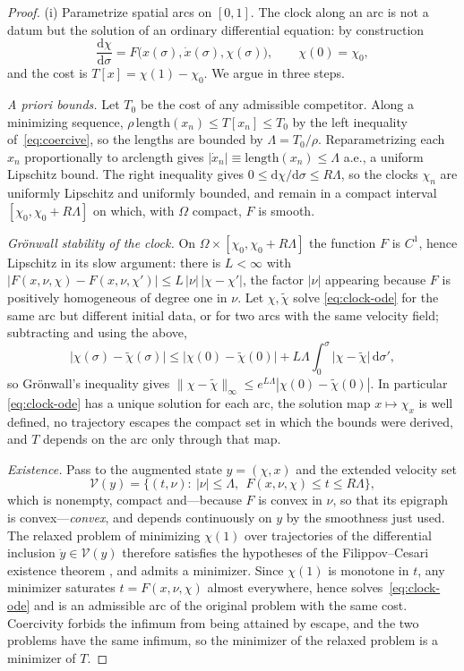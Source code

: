 \documentclass[12pt]{iopart}
\newcommand{\dd}{\mathrm{d}}
\theoremstyle{plain}
\theoremstyle{definition}
\theoremstyle{plain}
\theoremstyle{remark}
\begin{document}
\begin{proof}
(i) Parametrize spatial arcs on $[0,1]$. The clock along an arc is not a datum but the
solution of an ordinary differential equation: by construction
\begin{equation}
   \frac{\dd\chi}{\dd\sigma}=F\big(x(\sigma),\dot x(\sigma),\chi(\sigma)\big),
   \qquad \chi(0)=\chi_0 ,
   \label{eq:clock-ode}
\end{equation}
and the cost is $T[x]=\chi(1)-\chi_0$. We argue in three steps.

\emph{A priori bounds.} Let $T_0$ be the cost of any admissible competitor. Along a
minimizing sequence, $\rho\,\mathrm{length}(x_n)\le T[x_n]\le T_0$ by the left inequality
of~\eqref{eq:coercive}, so the lengths are bounded by $\Lambda=T_0/\rho$. Reparametrizing
each $x_n$ proportionally to arclength gives $|\dot x_n|\equiv\mathrm{length}(x_n)\le\Lambda$
a.e., a uniform Lipschitz bound. The right inequality gives
$0\le\dd\chi/\dd\sigma\le R\Lambda$, so the clocks $\chi_n$ are uniformly Lipschitz and
uniformly bounded, and remain in a compact interval $[\chi_0,\chi_0+R\Lambda]$ on which,
with $\Omega$ compact, $F$ is smooth.

\emph{Gr\"onwall stability of the clock.} On $\Omega\times[\chi_0,\chi_0+R\Lambda]$ the
function $F$ is $C^1$, hence Lipschitz in its slow argument: there is $L<\infty$ with
$|F(x,\nu,\chi)-F(x,\nu,\chi')|\le L\,|\nu|\,|\chi-\chi'|$, the factor $|\nu|$ appearing
because $F$ is positively homogeneous of degree one in $\nu$. Let $\chi,\tilde\chi$ solve
\eqref{eq:clock-ode} for the same arc but different initial data, or for two arcs with the
same velocity field; subtracting and using the above,
\[
   \big|\chi(\sigma)-\tilde\chi(\sigma)\big|
   \le\big|\chi(0)-\tilde\chi(0)\big|
   +L\Lambda\!\int_0^{\sigma}\!\big|\chi-\tilde\chi\big|\,\dd\sigma' ,
\]
so Gr\"onwall's inequality gives
$\|\chi-\tilde\chi\|_\infty\le e^{L\Lambda}|\chi(0)-\tilde\chi(0)|$. In particular
\eqref{eq:clock-ode} has a unique solution for each arc, the solution map
$x\mapsto\chi_x$ is well defined, no trajectory escapes the compact set in which the
bounds were derived, and $T$ depends on the arc only through that map.

\emph{Existence.} Pass to the augmented state $y=(\chi,x)$ and the extended velocity set
\[
   \mathcal V(y)=\big\{(t,\nu):\ |\nu|\le\Lambda,\ \ F(x,\nu,\chi)\le t\le R\Lambda\big\},
\]
which is nonempty, compact and---because $F$ is convex in $\nu$, so that its epigraph is
convex---\emph{convex}, and depends continuously on $y$ by the smoothness just used. The
relaxed problem of minimizing $\chi(1)$ over trajectories of the differential inclusion
$\dot y\in\mathcal V(y)$ therefore satisfies the hypotheses of the Filippov--Cesari
existence theorem \cite{Cesari1983,Filippov1962}, and admits a minimizer. Since $\chi(1)$
is monotone in $t$, any minimizer saturates $t=F(x,\nu,\chi)$ almost everywhere, hence
solves~\eqref{eq:clock-ode} and is an admissible arc of the original problem with the same
cost. Coercivity forbids the infimum from being attained by escape, and the two problems
have the same infimum, so the minimizer of the relaxed problem is a minimizer of $T$.


\end{proof}
\end{document}
